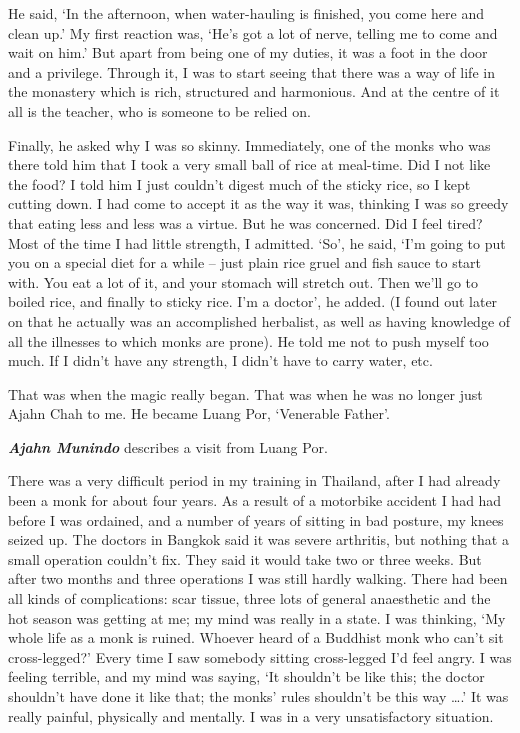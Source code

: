 He said, `In the afternoon, when water-hauling is finished, you come
here and clean up.' My first reaction was, `He's got a lot of nerve, 
telling me to come and wait on him.' But apart from being one of my
duties, it was a foot in the door and a privilege. Through it, I was to
start seeing that there was a way of life in the monastery which is
rich, structured and harmonious. And at the centre of it all is the
teacher, who is someone to be relied on. 

Finally, he asked why I was so skinny. Immediately, one of the monks who
was there told him that I took a very small ball of rice at meal-time. 
Did I not like the food? I told him I just couldn't digest much of the
sticky rice, so I kept cutting down. I had come to accept it as the way
it was, thinking I was so greedy that eating less and less was a virtue. 
But he was concerned. Did I feel tired? Most of the time I had little
strength, I admitted. `So', he said, `I'm going to put you on a special
diet for a while -- just plain rice gruel and fish sauce to start with. 
You eat a lot of it, and your stomach will stretch out. Then we'll go to
boiled rice, and finally to sticky rice. I'm a doctor', he added. (I
found out later on that he actually was an accomplished herbalist, as
well as having knowledge of all the illnesses to which monks are prone). 
He told me not to push myself too much. If I didn't have any strength, I
didn't have to carry water, etc. 

That was when the magic really began. That was when he was no longer
just Ajahn Chah to me. He became Luang Por, `Venerable Father'. 

\textbf{\emph{Ajahn Munindo}} describes a visit from Luang Por. 

There was a very difficult period in my training in Thailand, after I
had already been a monk for about four years. As a result of a motorbike
accident I had had before I was ordained, and a number of years of
sitting in bad posture, my knees seized up. The doctors in Bangkok said
it was severe arthritis, but nothing that a small operation couldn't
fix. They said it would take two or three weeks. But after two months
and three operations I was still hardly walking. There had been all
kinds of complications: scar tissue, three lots of general anaesthetic
and the hot season was getting at me; my mind was really in a state. I
was thinking, `My whole life as a monk is ruined. Whoever heard of a
Buddhist monk who can't sit cross-legged?' Every time I saw somebody
sitting cross-legged I'd feel angry. I was feeling terrible, and my mind
was saying, `It shouldn't be like this; the doctor shouldn't have done
it like that; the monks' rules shouldn't be this way \ldots{}.' It was
really painful, physically and mentally. I was in a very unsatisfactory
situation. 

